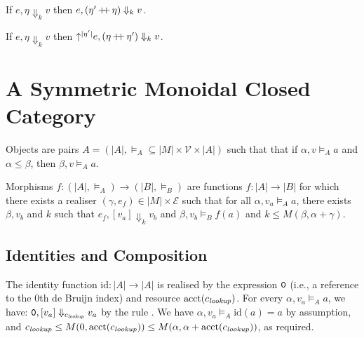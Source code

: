 \documentclass{workingnote}
\newcommand{\account}{\mathrm{acct}}
\newcommand{\id}{\mathrm{id}}
\begin{document}
\begin{lemma}
  \label{lem:eval-weaken}
  If $e,\eta \Downarrow_k v$ then $e,(\eta' \mathop{+\kern-3pt+} \eta) \Downarrow_k v$.
\end{lemma}

\begin{lemma}
  \label{lem:eval-shift}
  If $e,\eta \Downarrow_k v$ then $\mathord\uparrow^{|\eta'|}e,(\eta \mathop{+\kern-3pt+} \eta') \Downarrow_k v$.
\end{lemma}

\section{A Symmetric Monoidal Closed Category}

Objects are pairs
$A = (|A|, \models_A \subseteq |M| \times \mathcal{V} \times |A|)$
such that that if $\alpha, v \models_A a$ and $\alpha \leq \beta$,
then $\beta, v \models_A a$.


Morphisms $f : (|A|, \models_A) \to (|B|, \models_B)$ are functions
$f : |A| \to |B|$ for which there exists a realiser
$(\gamma,e_f) \in |M| \times \mathcal{E}$ such that for all
$\alpha, v_a \models_A a$, there exists $\beta, v_b$ and $k$ such
that $e_f,[v_a] \Downarrow_k v_b$ and $\beta, v_b \models_B f(a)$ and
$k \leq M(\beta, \alpha + \gamma)$.

\subsection{Identities and Composition}

The identity function $\id : |A| \to |A|$ is realised by the
expression $\texttt{0}$ (i.e., a reference to the $0$th de Bruijn index)
and resource $\account(\cnstLookup)$. For every
$\alpha, v_a \models_A a$, we have:
$\texttt{0}, [v_a] \Downarrow_{c_{\mathit{lookup}}} v_a$ by the rule
. We have $\alpha, v_a \models_A \id(a) = a$ by
assumption, and
$\cnstLookup \leq M(0,\account(\cnstLookup)) \leq M(\alpha, \alpha +
\account(\cnstLookup))$, as required.
\end{document}
